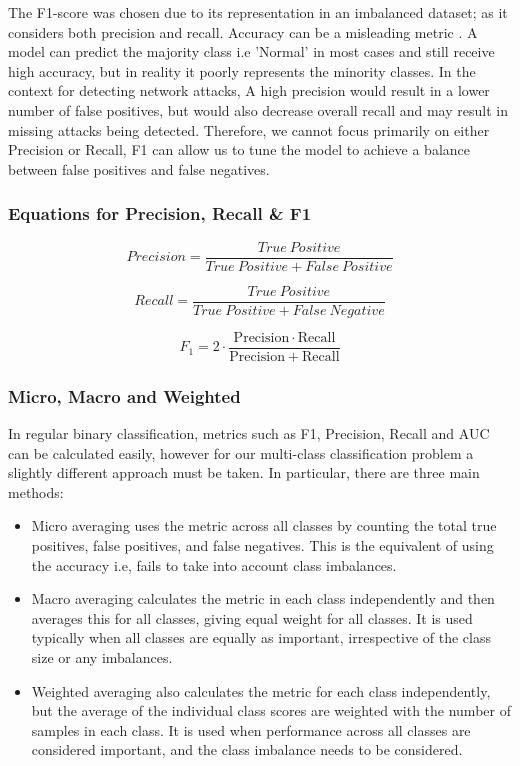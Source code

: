 The F1-score was chosen due to its representation in an imbalanced dataset; as it considers both precision and recall. Accuracy can be a misleading metric \parencite{FAWCETT2006861, grandini2020metrics}. A model can predict the majority class i.e 'Normal' in most cases and still receive high accuracy, but in reality it poorly represents the minority classes. In the context for detecting network attacks, A high precision would result in a lower number of false positives, but would also decrease overall recall and may result in missing attacks being detected. Therefore, we cannot focus primarily on either Precision or Recall, F1 can allow us to tune the model to achieve a balance between false positives and false negatives.

\subsubsection*{Equations for Precision, Recall \& F1} 

\begin{equation*} Precision = \frac{True\ Positive}{True\ Positive + False\ Positive} \end{equation*}

\begin{equation*} Recall = \frac{True\ Positive}{True\ Positive + False\ Negative} \end{equation*}

\begin{equation*}
F_1 = 2 \cdot \frac{\mathrm{Precision} \cdot \mathrm{Recall}}{\mathrm{Precision} + \mathrm{Recall}}
\end{equation*}

\subsubsection*{Micro, Macro and Weighted}

In regular binary classification, metrics such as F1, Precision, Recall and AUC can be calculated easily, however for our multi-class classification problem a slightly different approach must be taken. In particular, there are three main methods:

\begin{itemize}
    \item Micro averaging uses the metric across all classes by counting the total true positives, false positives, and false negatives. This is the equivalent of using the accuracy i.e, fails to take into account class imbalances.
    \item Macro averaging calculates the metric in each class independently and then averages this for all classes, giving equal weight for all classes. It is used typically when all classes are equally as important, irrespective of the class size or any imbalances.
    \item Weighted averaging also calculates the metric for each class independently, but the average of the individual class scores are weighted with the number of samples in each class. It is used when performance across all classes are considered important, and the class imbalance needs to be considered.
\end{itemize}

